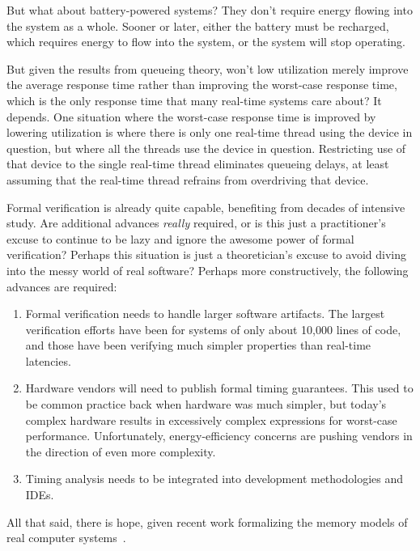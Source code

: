 \QuickQ{}
	But what about battery-powered systems?
	They don't require energy flowing into the system as a whole.
\QuickA{}
	Sooner or later, either the battery must be recharged, which
	requires energy to flow into the system, or the system will
	stop operating.

\QuickQ{}
	But given the results from queueing theory, won't low utilization
	merely improve the average response time rather than improving
	the worst-case response time, which is the only response time
	that many real-time systems care about?
\QuickA{}
	It depends.
	One situation where the worst-case response time is improved by
	lowering utilization is where there is only one real-time thread
	using the device in question, but where all the threads use
	the device in question.
	Restricting use of that device to the single real-time thread
	eliminates queueing delays, at least assuming that the
	real-time thread refrains from overdriving that device.

\QuickQ{}
	Formal verification is already quite capable, benefiting from
	decades of intensive study.
	Are additional advances \emph{really} required, or is this
	just a practitioner's excuse to continue to be lazy and ignore
	the awesome power of formal verification?
\QuickA{}
	Perhaps this situation is just a theoretician's excuse to avoid
	diving into the messy world of real software?
	Perhaps more constructively, the following advances are required:

	\begin{enumerate}
	\item	Formal verification needs to handle larger software
		artifacts.
		The largest verification efforts have been for systems
		of only about 10,000 lines of code, and those have been
		verifying much simpler properties than real-time latencies.
	\item	Hardware vendors will need to publish formal timing
		guarantees.
		This used to be common practice back when hardware was
		much simpler, but today's complex hardware results in
		excessively complex expressions for worst-case performance.
		Unfortunately, energy-efficiency concerns are pushing
		vendors in the direction of even more complexity.
	\item	Timing analysis needs to be integrated into development
		methodologies and IDEs.
	\end{enumerate}

	All that said, there is hope, given recent work formalizing
	the memory models of real computer
	systems~\cite{JadeAlglave2011ppcmem,Alglave:2013:SVW:2450268.2450306}.

